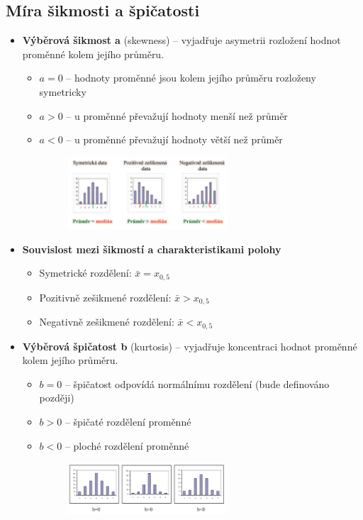 \subsection{Míra šikmosti a špičatosti}	
 		\begin{itemize}
 			\item \textbf{Výběrová šikmost a} (skewness) -- vyjadřuje asymetrii rozložení hodnot proměnné kolem jejího průměru.
 				\begin{itemize}
 					\item $a = 0$ -- hodnoty proměnné jsou kolem jejího průměru rozloženy symetricky
					\item $a > 0$ -- u proměnné převažují hodnoty menší než průměr
					\item $a < 0$ -- u proměnné převažují hodnoty větší než průměr
				\begin{figure}[H]
				\centering
				\includegraphics[width=0.6\textwidth]{assets/13_sikmost}
				\end{figure}
				\end{itemize}
				\item \textbf{Souvislost mezi šikmostí a charakteristikami polohy}
				\begin{itemize}
							\item Symetrické rozdělení: $\bar{x} = x_{0,5}$
							\item Pozitivně zešikmené rozdělení: $\bar{x} > x_{0,5}$
							\item Negativně zešikmené rozdělení: $\bar{x} < x_{0,5}$
				\end{itemize}
 			\item \textbf{Výběrová špičatost b} (kurtosis) -- vyjadřuje koncentraci hodnot proměnné kolem jejího průměru.
 				\begin{itemize}
 					\item $b = 0$ -- špičatost odpovídá normálnímu rozdělení (bude definováno později)
					\item $b > 0$ -- špičaté rozdělení proměnné
					\item $b < 0$ -- ploché rozdělení proměnné
				\begin{figure}[H]
				\centering
				\includegraphics[width=0.6\textwidth]{assets/13_spicatost}
				\end{figure}
				\end{itemize}
 		\end{itemize}

